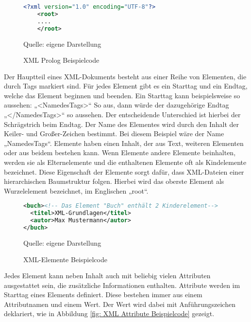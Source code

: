 \begin{figure}[H]
\centering
\begin{minipage}{0.95\textwidth}
\begin{lstlisting}[language=XML]
<?xml version="1.0" encoding="UTF-8"?>
    <root>
    ....
    </root>
\end{lstlisting}
\end{minipage}
\caption{XML Prolog Beispielcode}
\label{fig: XML Prolog Beispielcode}
    {Quelle: eigene Darstellung}
\end{figure}


Der Hauptteil eines \ac{XML}-Dokuments besteht aus einer Reihe von Elementen, die durch Tags markiert sind.
Für jedes Element gibt es ein Starttag und ein Endtag, welche das Element beginnen und beenden.
Ein Starttag kann beispielsweise so aussehen: „<NamedesTags>“ So aus, dann würde der dazugehörige Endtag „</NamedesTags>“ so aussehen.
Der entscheidende Unterschied ist hierbei der Schrägstrich beim Endtag.
Der Name des Elementes wird durch den Inhalt der Keiler- und Großer-Zeichen bestimmt.
Bei diesem Beispiel wäre der Name „NamedesTags“.
Elemente haben einen Inhalt, der aus Text, weiteren Elementen oder aus beidem bestehen kann.
Wenn Elemente andere Elemente beinhalten, werden sie als Elternelemente und die enthaltenen Elemente oft als Kindelemente bezeichnet.
Diese Eigenschaft der Elemente sorgt dafür, dass \ac{XML}-Dateien einer hierarchischen Baumstruktur folgen.
Hierbei wird das oberste Element als Wurzelelement bezeichnet, im Englischen „root“. \cite*[10-14]{Becher2022}

\begin{figure}[H]
\centering
\begin{minipage}{0.95\textwidth}
\begin{lstlisting}[language=XML]
<buch><!-- Das Element "Buch" enthält 2 Kinderelement-->
  <titel>XML-Grundlagen</titel>
  <autor>Max Mustermann</autor>
</buch>
\end{lstlisting}
\end{minipage}
\caption{XML-Elemente Beispielcode}
\label{fig:XML Elemente Beispielcode}
    {Quelle: eigene Darstellung}
\end{figure}

Jedes Element kann neben Inhalt auch mit beliebig vielen Attributen ausgestattet sein, die zusätzliche Informationen enthalten.
Attribute werden im Starttag eines Elements definiert. Diese bestehen immer aus einem Attributnamen und einem Wert.
Der Wert wird dabei mit Anführungszeichen deklariert, wie in Abbildung \ref{fig: XML Attribute Beispielcode} gezeigt. \cite*[10-14]{Becher2022}

